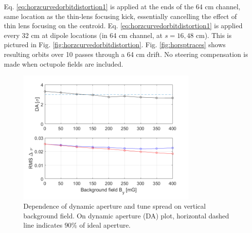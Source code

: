 Eq. \ref{eq:horzcurvedorbitdistortion1} is applied at the ends of the 64 cm channel, same location as the thin-lens focusing kick, essentially cancelling the effect of thin lens focusing on the centroid. Eq. \ref{eq:horzcurvedorbitdistortion1} is applied every 32 cm at dipole locations (in 64 cm channel, at $s=16,48$ cm). This is pictured in Fig. \ref{fig:horzcurvedorbitdistortion}. Fig. \ref{fig:horsptraces} shows resulting orbits over 10 passes through a 64 cm drift. No steering compensation is made when octupole fields are included.

\begin{figure}
\centering
\includegraphics[width=0.8\textwidth]{5.figures/steeringtolerance/DA_deltanu_plots_vs_background_By.png}
\caption{Dependence of dynamic aperture and tune spread on vertical background field. On dynamic aperture (DA) plot, horizontal dashed line indicates $90\%$ of ideal aperture.}
\label{fig:DAvsBGfield}
\end{figure}

